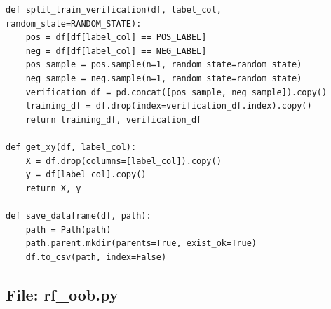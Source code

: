 \documentclass[11pt]{article}
\begin{document}
\begin{lstlisting}[style=pythonstyle]
def split_train_verification(df, label_col, random_state=RANDOM_STATE):
    pos = df[df[label_col] == POS_LABEL]
    neg = df[df[label_col] == NEG_LABEL]
    pos_sample = pos.sample(n=1, random_state=random_state)
    neg_sample = neg.sample(n=1, random_state=random_state)
    verification_df = pd.concat([pos_sample, neg_sample]).copy()
    training_df = df.drop(index=verification_df.index).copy()
    return training_df, verification_df

def get_xy(df, label_col):
    X = df.drop(columns=[label_col]).copy()
    y = df[label_col].copy()
    return X, y

def save_dataframe(df, path):
    path = Path(path)
    path.parent.mkdir(parents=True, exist_ok=True)
    df.to_csv(path, index=False)
\end{lstlisting}

\subsection*{File: rf\_oob.py}
\end{document}
